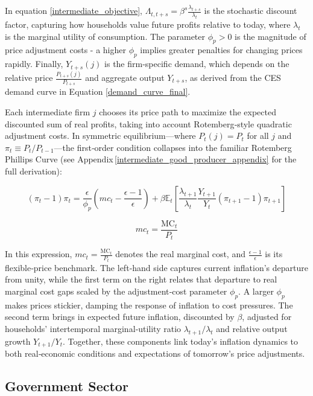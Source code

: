 \documentclass[11pt,preprint]{elsarticle}
\numberwithin{equation}{section}
\numberwithin{figure}{section}
\numberwithin{table}{section}
\begin{document}
In equation \eqref{intermediate_objective},
\(\Lambda_{t,t+s} = \beta^s \frac{\lambda_{t+s}}{\lambda_t}\) is the
stochastic discount factor, capturing how households value future
profits relative to today, where \(\lambda_t\) is the marginal utility
of consumption. The parameter \(\phi_p > 0\) is the magnitude of price
adjustment costs - a higher \(\phi_p\) implies greater penalties for
changing prices rapidly. Finally, \(Y_{t+s}(j)\) is the firm-specific
demand, which depends on the relative price
\(\frac{P_{t+s}(j)}{P_{t+s}}\) and aggregate output \(Y_{t+s}\), as
derived from the CES demand curve in Equation
\eqref{demand_curve_final}.

Each intermediate firm \(j\) chooses its price path to maximize the
expected discounted sum of real profits, taking into account
Rotemberg‐style quadratic adjustment costs. In symmetric
equilibrium---where \(P_t(j)=P_t\) for all \(j\) and
\(\pi_t \equiv P_t/P_{t-1}\)---the first‐order condition collapses into
the familiar Rotemberg Phillips Curve (see
Appendix\,\ref{intermediate_good_producer_appendix} for the full
derivation):

\begin{equation}
(\pi_t - 1)\pi_t = \frac{\epsilon}{\phi_p} \left( mc_t - \frac{\epsilon-1}{\epsilon} \right) + \beta \mathbb{E}_t \left[ \frac{\lambda_{t+1}}{\lambda_t} \frac{Y_{t+1}}{Y_t} (\pi_{t+1} - 1)\pi_{t+1} \right]
\label{nkpc}
\end{equation}

\begin{equation}
mc_t = \frac{\text{MC}_t}{P_t}
\label{real_mc}
\end{equation}

In this expression, \(mc_t = \tfrac{\mathrm{MC}_t}{P_t}\) denotes the
real marginal cost, and \(\tfrac{\epsilon-1}{\epsilon}\) is its
flexible‐price benchmark. The left‐hand side captures current
inflation's departure from unity, while the first term on the right
relates that departure to real marginal cost gaps scaled by the
adjustment‐cost parameter \(\phi_p\). A larger \(\phi_p\) makes prices
stickier, damping the response of inflation to cost pressures. The
second term brings in expected future inflation, discounted by
\(\beta\), adjusted for households' intertemporal marginal‐utility ratio
\(\lambda_{t+1}/\lambda_t\) and relative output growth \(Y_{t+1}/Y_t\).
Together, these components link today's inflation dynamics to both
real‐economic conditions and expectations of tomorrow's price
adjustments.

\subsection{Government Sector}\label{government-sector}
\end{document}
